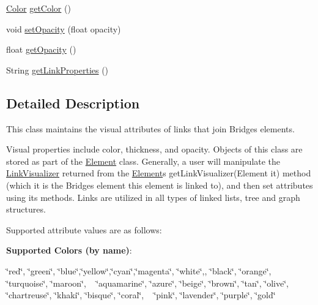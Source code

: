 \begin{DoxyCompactItemize}
\item 
\mbox{\hyperlink{classbridges_1_1base_1_1_color}{Color}} \mbox{\hyperlink{classbridges_1_1base_1_1_link_visualizer_a3ed52d98ecab99c6d8dd136fba913b7d}{get\+Color}} ()
\item 
void \mbox{\hyperlink{classbridges_1_1base_1_1_link_visualizer_ac0d59614dbc65ed0a19c25c493a1deaa}{set\+Opacity}} (float opacity)
\item 
float \mbox{\hyperlink{classbridges_1_1base_1_1_link_visualizer_a07cdd435a54e4b612ad63614f2a27a4a}{get\+Opacity}} ()
\item 
String \mbox{\hyperlink{classbridges_1_1base_1_1_link_visualizer_ab64d9b7e2b99f7ebce80cbabfe4adf2a}{get\+Link\+Properties}} ()
\end{DoxyCompactItemize}


\subsection{Detailed Description}
This class maintains the visual attributes of links that join Bridges elements. 

Visual properties include color, thickness, and opacity. Objects of this class are stored as part of the \mbox{\hyperlink{classbridges_1_1base_1_1_element}{Element}} class. Generally, a user will manipulate the \mbox{\hyperlink{classbridges_1_1base_1_1_link_visualizer}{Link\+Visualizer}} returned from the \mbox{\hyperlink{classbridges_1_1base_1_1_element}{Element}}\textquotesingle{}s get\+Link\+Visualizer(\+Element it) method (which it is the Bridges element this element is linked to), and then set attributes using its methods. Links are utilized in all types of linked lists, tree and graph structures.

Supported attribute values are as follows\+:

{\bfseries{Supported Colors (by name)}}\+: 

\char`\"{}red\char`\"{}, \char`\"{}green\char`\"{}, \char`\"{}blue\char`\"{},\char`\"{}yellow\char`\"{},\char`\"{}cyan\char`\"{},\char`\"{}magenta\char`\"{}, \char`\"{}white\char`\"{},, \char`\"{}black\char`\"{}, \char`\"{}orange\char`\"{}, \char`\"{}turquoise\char`\"{}, \char`\"{}maroon\char`\"{}, ~\newline
 \char`\"{}aquamarine\char`\"{}, \char`\"{}azure\char`\"{}, \char`\"{}beige\char`\"{}, \char`\"{}brown\char`\"{}, \char`\"{}tan\char`\"{}, \char`\"{}olive\char`\"{}, \char`\"{}chartreuse\char`\"{}, \char`\"{}khaki\char`\"{}, \char`\"{}bisque\char`\"{}, \char`\"{}coral\char`\"{}, ~\newline
 \char`\"{}pink\char`\"{}, \char`\"{}lavender\char`\"{}, \char`\"{}purple\char`\"{}, \char`\"{}gold\char`\"{} 

